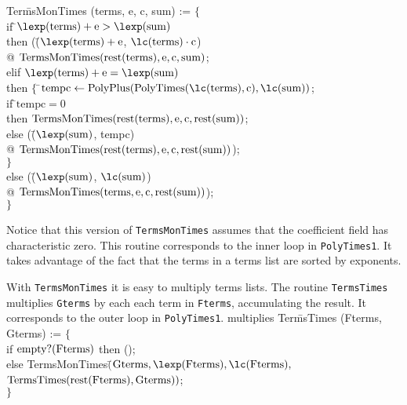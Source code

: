 \begindsacode
Ter\=msMonTimes (terms, e, c, sum) := $\{$ \\
\>if \=$\lexp(\mbox{terms}) + \mbox{e} > \lexp(\mbox{sum})$ \\
\>\>then (\=($\lexp(\mbox{terms}) + \mbox{e}$, $\lc(\mbox{terms})\cdot\mbox{c}$)\\
\>\>\>@ $\mbox{TermsMonTimes}(\mathop{\rm rest}\nolimits(\mbox{terms}), \mbox{e}, \mbox{c}, \mbox{sum})$;\\
\>elif $\lexp(\mbox{terms}) + \mbox{e} = \lexp(\mbox{sum})$ \\
\>\>then $\{$ \=$\mbox{tempc} \leftarrow
\mbox{PolyPlus}(\mbox{PolyTimes}(\lc(\mbox{terms}), \mbox{c}), \lc(\mbox{sum}))$; \\
\>\>\>if \=$\mbox{tempc} = 0$ \\
\>\>\>\>then $\mbox{TermsMonTimes}(\mathop{\rm rest}\nolimits(\mbox{terms}), \mbox{e}, \mbox{c}, \mathop{\rm rest}\nolimits(\mbox{sum}))$;\\
\>\>\>else (\=($\lexp(\mbox{sum})$, tempc) \\
\>\>\>\>@ $\mbox{TermsMonTimes}(\mathop{\rm rest}\nolimits(\mbox{terms}), \mbox{e}, \mbox{c}, \mathop{\rm rest}\nolimits(\mbox{sum}))$);\\
\>\>\>$\}$\\
\>else (\=($\lexp(\mbox{sum})$, $\lc(\mbox{sum})$)\\
\>\>@ $\mbox{TermsMonTimes}(\mbox{terms}, \mbox{e}, \mbox{c}, \mathop{\rm rest}\nolimits(\mbox{sum}))$);\\
\>$\}$
\enddsacode

\noindent
Notice that this version of {\tt TermsMonTimes} assumes that the
coefficient field has characteristic zero.  This routine corresponds
to the inner loop in {\tt PolyTimes1}.  It takes advantage of the fact
that the terms in a terms list are sorted by exponents.

With {\tt TermsMonTimes} it is easy to multiply terms lists.  The
routine {\tt TermsTimes} multiplies {\tt Gterms} by each each term in
{\tt Fterms}, accumulating the result.  It corresponds to the outer
loop in {\tt PolyTimes1}. 
multiplies 
\begindsacode
Ter\=msTimes (Fterms, Gterms) := $\{$ \\
\>if $\mathop{\rm empty?}\nolimits(\mbox{Fterms})$ then (); \\
\>else TermsMonTimes$($\=$\mbox{Gterms}, \lexp(\mbox{Fterms}), \lc(\mbox{Fterms}),$\\
\>\>$\mbox{TermsTimes}(\mathop{\rm rest}\nolimits(\mbox{Fterms}), \mbox{Gterms}))$;\\
\> $\}$
\enddsacode

